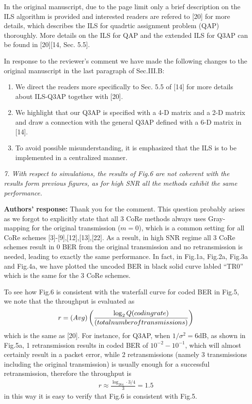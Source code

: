 \documentclass[onecolumn, 11pt, draftclsnofoot]{IEEEtran}
\begin{document}
In the original manuscript, due to the page limit only a brief description on
the ILS algorithm is provided and interested readers are refered to [20] for
more details, which describes the ILS for quadrtic assignment problem (QAP)
thoroughly. More details on the ILS for QAP and the extended ILS for Q3AP can be
found in [20][14, Sec. 5.5].

In response to the reviewer's comment we have made the following changes to the
original manuscript in the last paragraph of Sec.III.B:
\begin{enumerate}
  \item We direct the readers more specifically to Sec. 5.5 of [14] for more
  details about ILS-Q3AP together with [20].
  \item We highlight that our Q3AP is specified with a 4-D matrix and a
  2-D matrix and draw a connection with the general Q3AP defined with a 6-D
  matrix in [14].
  \item To avoid possible misunderstanding, it is emphasized that the ILS is to
  be implemented in a centralized manner.
\end{enumerate}

\vspace{0.5cm}

\noindent
\emph{7. With respect to simulations, the results of Fig.6 are not coherent with
the results form previous figures, as for high SNR all the methods exhibit the
same performance.}

\noindent \textbf{Authors' response:}
Thank you for the comment. This question probably arises as we forgot to
explicitly state that all 3 CoRe methods always uses Gray-mapping for the
original transmission ($m=0$), which is a common setting for all CoRe schemes
[3]-[9],[12],[13],[22]. As a result, in high SNR regime all 3 CoRe schemes
result in 0 BER from the original transmission and no retransmission is needed,
leading to exactly the same performance. In fact, in Fig.1a, Fig.2a, Fig.3a and
Fig.4a, we have plotted the uncoded BER in black solid curve labled ``TR0''
which is the same for the 3 CoRe schemes.

To see how Fig.6 is consistent with the waterfall curve for coded BER in Fig.5,
we note that the throughput is evaluated as
\begin{align}
  r=\mbox(Avg)\left( \frac{\log_2Q \mbox{(coding rate)}}{\mbox{(total number of
  transmissions)}} \right)
\end{align}
which is the same as [20]. For instance, for Q3AP, when
$1/\sigma^2=6$dB, as shown in Fig.5a, 1 retransmission results in coded BER of
$10^{-2}-10^{-1}$, which will almost certainly result in a packet error, while 2
retransmissions (namely 3 transmissions including the original transmission) is
usually enough for a successful retransmission, therefore the throughput is
\begin{align}
  r\approx \frac{\log_264\cdot 3/4}{3} = 1.5
\end{align}
in this way it is easy to verify that Fig.6 is consistent with Fig.5.
\end{document}
